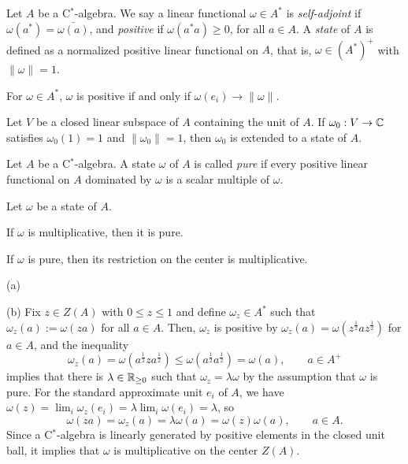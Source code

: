 \documentclass{../../large}
\begin{document}
\begin{prb}[States]
Let $A$ be a C$^*$-algebra.
We say a linear functional $\omega\in A^*$ is \emph{self-adjoint} if $\omega(a^*)=\bar{\omega(a)}$, and \emph{positive} if $\omega(a^*a)\ge0$, for all $a\in A$.
A \emph{state} of $A$ is defined as a normalized positive linear functional on $A$, that is, $\omega\in(A^*)^+$ with $\|\omega\|=1$.
\begin{parts}
\item For $\omega\in A^*$, $\omega$ is positive if and only if $\omega(e_i)\to\|\omega\|$.
\item Let $V$ be a closed linear subspace of $A$ containing the unit of $A$. If $\omega_0:V\to\mathbb{C}$ satisfies $\omega_0(1)=1$ and $\|\omega_0\|=1$, then $\omega_0$ is extended to a state of $A$.
\end{parts}
\end{prb}
\begin{pf}

\end{pf}


\begin{prb}
Let $A$ be a C$^*$-algebra.
A state $\omega$ of $A$ is called \emph{pure} if every positive linear functional on $A$ dominated by $\omega$ is a scalar multiple of $\omega$.

Let $\omega$ be a state of $A$.
\begin{parts}
\item If $\omega$ is multiplicative, then it is pure.
\item If $\omega$ is pure, then its restriction on the center is multiplicative.
\end{parts}
\end{prb}
\begin{pf}
(a)

(b)
Fix $z\in Z(A)$ with $0\le z\le1$ and define $\omega_z\in A^*$ such that $\omega_z(a):=\omega(za)$ for all $a\in A$.
Then, $\omega_z$ is positive by $\omega_z(a)=\omega(z^{\frac12}az^{\frac12})$ for $a\in A$, and the inequality
\[\omega_z(a)=\omega(a^{\frac12}za^{\frac12})\le\omega(a^{\frac12}a^{\frac12})=\omega(a),\qquad a\in A^+\]
implies that there is $\lambda\in\mathbb{R}_{\ge0}$ such that $\omega_z=\lambda\omega$ by the assumption that $\omega$ is pure.
For the standard approximate unit $e_i$ of $A$, we have $\omega(z)=\lim_i\omega_z(e_i)=\lambda\lim_i\omega(e_i)=\lambda$, so
\[\omega(za)=\omega_z(a)=\lambda\omega(a)=\omega(z)\omega(a),\qquad a\in A.\]
Since a C$^*$-algebra is linearly generated by positive elements in the closed unit ball, it implies that $\omega$ is multiplicative on the center $Z(A)$.
\end{pf}
\end{document}
